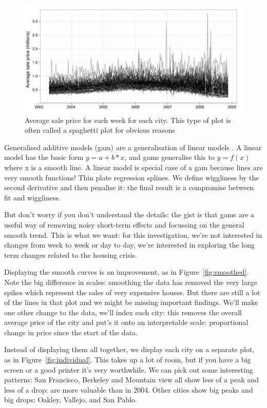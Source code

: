 \documentclass[oneside]{article}
\begin{document}
\begin{figure}[htbp]
  \centering
    \includegraphics[width=\linewidth]{cities-price}
  \caption{Average sale price for each week for each city.  This type of plot is often called a spaghetti plot for obvious reasons}
  \label{fig:spaghetti}
\end{figure}

Generalised additive models ({\sc gam}) are a generalisation of linear models \citep{wood:2006}.  A linear model has the basic form $y = a + b * x$, and {\sc gam}s generalise this to $y = f(x)$ where x is a smooth line.  A linear model is special case of a {\sc gam} because lines are very smooth functions!  Thin plate regression splines.  We define wiggliness by the second derivative and then penalise it: the final result is a compromise between fit and wiggliness.

But don't worry if you don't understand the details: the gist is that {\sc gam}s are a useful way of removing noisy short-term effects and focussing on the general smooth trend.  This is what we want: for this investigation, we're not interested in changes from week to week or day to day, we're interested in exploring the long term changes related to the housing crisis.

Displaying the smooth curves is an improvement, as in Figure~\ref{fig:smoothed}.  Note the big difference in scales: smoothing the data has removed the very large spikes which represent the sales of very expensive houses.  But there are still a lot of the lines in that plot and we might be missing important findings.  We'll make one other change to the data, we'll index each city: this removes the overall average price of the city and put's it onto an interpretable scale: proportional change in price since the start of the data.  

Instead of displaying them all together, we display each city on a separate plot, as in Figure~\ref{fig:individual}.  This takes up a lot of room, but if you have a big screen or a good printer it's very worthwhile.  We can pick out some interesting patterns: San Francisco, Berkeley and Mountain view all show less of a peak and less of a drop: are more valuable than in 2004.  Other cities show big peaks and big drops: Oakley, Vallejo, and San Pablo.
\end{document}
